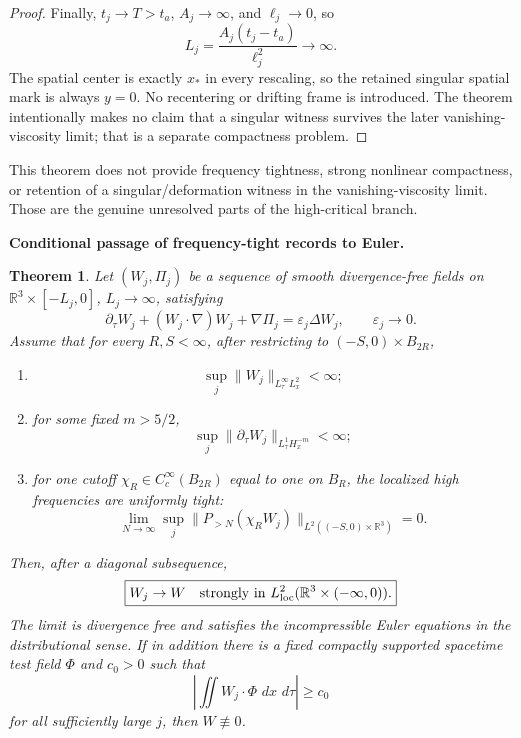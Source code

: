 \documentclass[11pt]{article}
\newtheorem{theorem}{Theorem}[section]
\theoremstyle{definition}\newtheorem{problem}[theorem]{Problem}
\theoremstyle{definition}
\theoremstyle{remark}
\newcommand{\dd}{\,d}
\begin{document}
\begin{proof}
Finally, \(t_j\to T>t_a\), \(A_j\to\infty\), and \(\ell_j\to0\), so
\[
 L_j=\frac{A_j(t_j-t_a)}{\ell_j^2}\to\infty.
\]
The spatial center is exactly \(x_*\) in every rescaling, so the retained
singular spatial mark is always \(y=0\).  No recentering or drifting frame is
introduced.  The theorem intentionally makes no claim that a singular witness
survives the later vanishing-viscosity limit; that is a separate compactness
problem.
\end{proof}

This theorem does not provide frequency tightness, strong nonlinear compactness, or retention of a singular/deformation witness in the vanishing-viscosity limit.  Those are the genuine unresolved parts of the high-critical branch.

\medskip
\noindent\textbf{Conditional passage of frequency-tight records to Euler.}
\begin{theorem}\label{thm:conditional-euler-passage}
Let \((W_j,\Pi_j)\) be a sequence of smooth divergence-free fields on
\(\mathbb R^3\times[-L_j,0]\), \(L_j\to\infty\), satisfying
\[
 \partial_\tau W_j+(W_j\cdot\nabla)W_j+\nabla\Pi_j
 =\varepsilon_j\Delta W_j,
 \qquad
 \varepsilon_j\to0.
\]
Assume that for every \(R,S<\infty\), after restricting to
\((-S,0)\times B_{2R}\),

\begin{enumerate}[label=(\roman*),leftmargin=*]
\item
\[
 \sup_j\|W_j\|_{L^\infty_\tau L^2_x}<\infty;
\]
\item for some fixed \(m>5/2\),
\[
 \sup_j
 \|\partial_\tau W_j\|_{L^1_\tau H^{-m}_x}<\infty;
\]
\item for one cutoff \(\chi_R\in C_c^\infty(B_{2R})\) equal to one on
\(B_R\), the localized high frequencies are uniformly tight:
\[
 \lim_{N\to\infty}
 \sup_j
 \|P_{>N}(\chi_RW_j)\|_{L^2((-S,0)\times\mathbb R^3)}
 =0.
\]
\end{enumerate}

Then, after a diagonal subsequence,
\[
 \boxed{W_j\to W\quad\text{strongly in }L^2_{\rm loc}
 (\mathbb R^3\times(-\infty,0)).}
\]
The limit is divergence free and satisfies the incompressible Euler equations
in the distributional sense.  If in addition there is a fixed compactly
supported spacetime test field \(\Phi\) and \(c_0>0\) such that
\[
 \left|\iint W_j\cdot\Phi\,\dd x\,\dd\tau\right|\ge c_0
\]
for all sufficiently large \(j\), then \(W\not\equiv0\).
\end{theorem}
\end{document}

